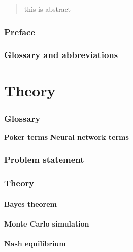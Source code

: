 
	





\begin{abstract}
this is abstract
\end{abstract}
\newpage

\section*{Preface}


\section*{Glossary and abbreviations}

\tableofcontents

\listoffigures

\part{Theory} 


\section{Glossary}
\textbf{Poker terms}
\textbf{Neural network terms}

\section{Problem statement}

\section{Theory}
\subsection{Bayes theorem}
\subsection{Monte Carlo simulation}

\subsection{Nash equilibrium}

